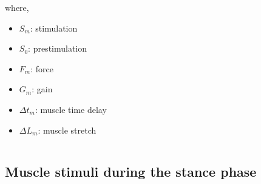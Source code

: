 \documentclass[10pt]{beamer}
\begin{document}
\begin{frame}
\begin{columns}
\begin{column}{.5\textwidth}
\begin{block}{}
					where,
					\begin{itemize}
						\item $S_{m}$: stimulation
						\item $S_{0}$: prestimulation
						\item $F_{m}$: force
						\item $G_{m}$: gain
						\item $\Delta t_{m}$: muscle time delay
						\item $\Delta L_m$: muscle stretch
					\end{itemize}
				\end{block}
			\end{column}
		\end{columns}
	\end{frame}
	
	\subsection[Methodology]{Muscle stimuli during the stance phase}
\end{document}
